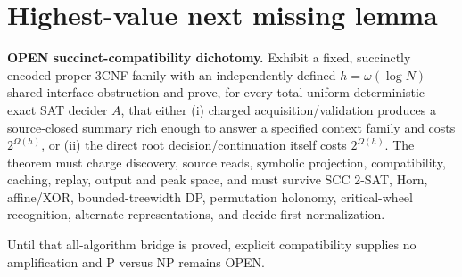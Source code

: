 \documentclass[11pt]{article}
\begin{document}
\section{Highest-value next missing lemma}

\textbf{OPEN succinct-compatibility dichotomy.}  Exhibit a fixed, succinctly
encoded proper-3CNF family with an independently defined $h=\omega(\log N)$
shared-interface obstruction and prove, for every total uniform deterministic
exact SAT decider $A$, that either (i) charged acquisition/validation produces
a source-closed summary rich enough to answer a specified context family and
costs $2^{\Omega(h)}$, or (ii) the direct root decision/continuation itself
costs $2^{\Omega(h)}$.  The theorem must charge discovery, source reads,
symbolic projection, compatibility, caching, replay, output and peak space,
and must survive SCC 2-SAT, Horn, affine/XOR, bounded-treewidth DP,
permutation holonomy, critical-wheel recognition, alternate representations,
and decide-first normalization.

Until that all-algorithm bridge is proved, explicit compatibility supplies
no amplification and P versus NP remains OPEN.
\end{document}
